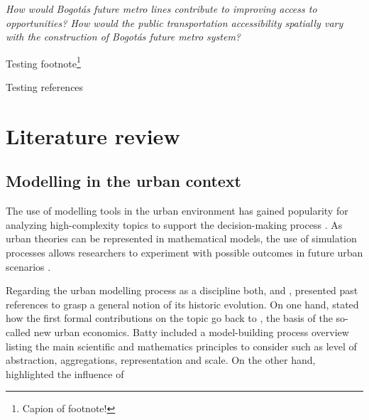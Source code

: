 \documentclass[12pt, a4paper]{report}
\begin{document}

\begin{center}
    \textit{How would Bogot\'{a}\textquotesingle s future metro lines contribute to improving access to opportunities? How would the public transportation accessibility spatially vary with the construction of Bogot\'{a}\textquotesingle s future metro system?}
\end{center}




Testing footnote\footnote{Capion of footnote!}

Testing references \citep{alcaldiamayordebogotad.c.EstacionesPrimeraLinea2022}


\chapter{Literature review} \label{Chap2}

\section{Modelling in the urban context}

The use of modelling tools in the urban environment has gained popularity for analyzing high-complexity topics to support the decision-making process \citep{houApproachBuildingOccupancy2020}. As urban theories can be represented in mathematical models, the use of simulation processes allows researchers to experiment with possible outcomes in future urban scenarios \citep{battyUrbanModeling2009a}.

Regarding the urban modelling process as a discipline both, \cite{battyUrbanModeling2009a} and \cite{wilsonFutureUrbanModelling2018}, presented past references to grasp a general notion of its historic evolution. On one hand, \cite{battyUrbanModeling2009a} stated how the first formal contributions on the topic go back to \cite{alonsoLocationLandUse1964}, the basis of the so-called new urban economics. Batty included a model-building process overview listing the main scientific and mathematics principles to consider such as level of abstraction, aggregations, representation and scale. On the other hand, \cite{wilsonFutureUrbanModelling2018} highlighted the influence of 
\end{document}
